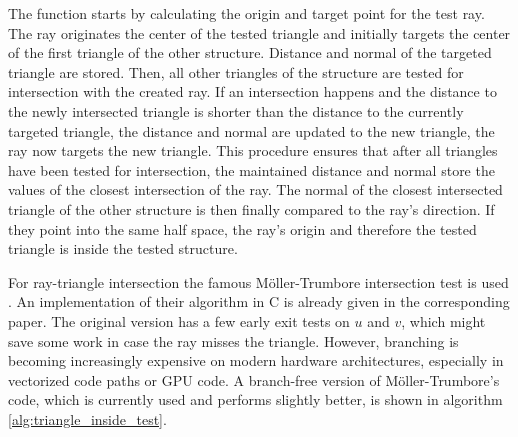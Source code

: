 %
The function starts by calculating the origin and target point for the test ray.
The ray originates the center of the tested triangle and initially targets the center of the first triangle of the other structure.
Distance and normal of the targeted triangle are stored.
Then, all other triangles of the structure are tested for intersection with the created ray.
If an intersection happens and the distance to the newly intersected triangle is shorter than the distance to the currently targeted triangle, the distance and normal are updated to the new triangle, \ie the ray now targets the new triangle.
This procedure ensures that after all triangles have been tested for intersection, the maintained distance and normal store the values of the closest intersection of the ray.
The normal of the closest intersected triangle of the other structure is then finally compared to the ray's direction.
If they point into the same half space, the ray's origin and therefore the tested triangle is inside the tested structure.

For ray-triangle intersection the famous Möller-Trumbore intersection test is used \cite{ray_triangle_intersection_moller}.
An implementation of their algorithm in C is already given in the corresponding paper.
The original version has a few early exit tests on $u$ and $v$, which might save some work in case the ray misses the triangle.
However, branching is becoming increasingly expensive on modern hardware architectures, especially in vectorized code paths or GPU code.
A branch-free version of Möller-Trumbore's code, which is currently used and performs slightly better, is shown in algorithm \ref{alg:triangle_inside_test}.


